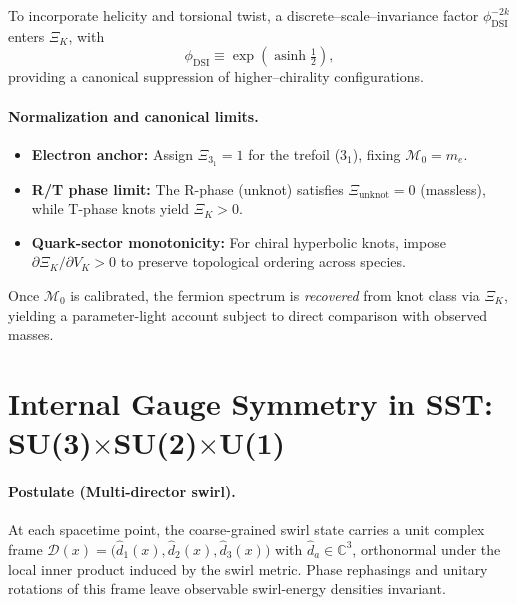 \documentclass[10pt,reprint,aps,onecolumn,nofootinbib]{revtex4-2}
\begin{document}
            To incorporate helicity and torsional twist, a discrete–scale–invariance factor $\phi_{\mathrm{DSI}}^{-2k}$ enters $\Xi_K$, with
            \[
                \phi_{\mathrm{DSI}} \equiv \exp\!\left(\operatorname{asinh}\tfrac12\right),
            \]
            providing a canonical suppression of higher–chirality configurations.

            \paragraph{Normalization and canonical limits.}
                \begin{itemize}
                \item \textbf{Electron anchor:} Assign $\Xi_{3_1}=1$ for the trefoil ($3_1$), fixing $\mathcal{M}_0=m_e$.
                \item \textbf{R/T phase limit:} The R-phase (unknot) satisfies $\Xi_{\mathrm{unknot}}=0$ (massless), while T-phase knots yield $\Xi_K>0$.
                \item \textbf{Quark-sector monotonicity:} For chiral hyperbolic knots, impose $\partial \Xi_K/\partial V_K>0$ to preserve topological ordering across species.
                \end{itemize}
                Once $\mathcal{M}_0$ is calibrated, the fermion spectrum is \emph{recovered} from knot class via $\Xi_K$, yielding a parameter-light account subject to direct comparison with observed masses.




    \section{Internal Gauge Symmetry in SST: SU(3)\texorpdfstring{$\times$}{×}SU(2)\texorpdfstring{$\times$}{×}U(1)}
    \label{sec:SST-gauge}

    \paragraph{Postulate (Multi-director swirl).}
        At each spacetime point, the coarse-grained swirl state carries a unit complex frame
        $\mathcal{D}(x) = \big( \hat{d}_1(x), \hat{d}_2(x), \hat{d}_3(x) \big)$
        with $\hat{d}_a \in \mathbb{C}^3$, orthonormal under the local inner product induced by the swirl metric.
        Phase rephasings and unitary rotations of this frame leave observable swirl-energy densities invariant.
\end{document}
